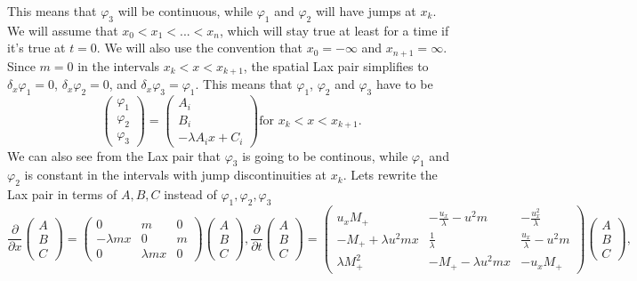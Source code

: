 \documentclass[english,master]{liumaiex}
\theoremstyle{plain}
\theoremstyle{definition}
\begin{document}
This means that $\varphi_3$ will be continuous, while $\varphi_1$ and $\varphi_2$ will have jumps at $x_k$. We will assume that $x_0 < x_1 < ... < x_n$, which will stay true at least for a time if it's true at $t = 0$. We will also use the convention that $x_0 = -\infty$ and $x_{n+1} = \infty$. Since $m = 0$ in the intervals $x_k < x < x_{k+1}$, the spatial Lax pair simplifies to $\delta_x \varphi_1 = 0$, $\delta_x \varphi_2 = 0$, and $\delta_x \varphi_3 = \varphi_1$. This means that $\varphi_1$, $\varphi_2$ and $\varphi_3$ have to be
\begin{equation}
\begin{pmatrix} \varphi_1 \\ \varphi_2 \\ \varphi_3 \end{pmatrix} =
\begin{pmatrix} A_i \\ B_i \\ -\lambda A_i x + C_i \end{pmatrix} 
\text{for } x_k < x < x_{k+1}.
\end{equation}
We can also see from the Lax pair that $\varphi_3$ is going to be continous, while $\varphi_1$ and $\varphi_2$ is constant in the intervals with jump discontinuities at $x_k$. Lets rewrite the Lax pair in terms of $A, B, C$ instead of $\varphi_1, \varphi_2, \varphi_3$
\begin{subequations}
  \begin{equation}
    \frac{\partial}{\partial x}
    \begin{pmatrix} A \\ B \\ C \end{pmatrix} =
    \begin{pmatrix}
      0 & m & 0 \\
      -\lambda m x & 0 & m \\
      0 & \lambda m x & 0
    \end{pmatrix}
    \begin{pmatrix} A \\ B \\ C \end{pmatrix}
    ,
  \end{equation}
  \begin{equation}
    \frac{\partial}{\partial t}
    \begin{pmatrix} A \\ B \\ C \end{pmatrix} =
    \begin{pmatrix}
      u_x M_+ & -\frac{u_x}{\lambda} -u^2 m & -\frac{u_x^2}{\lambda} \\
      -M_+ + \lambda u^2 m x & \frac{1}{\lambda} & \frac{u_x}{\lambda} - u^2 m \\
      \lambda M_+^2 & -M_+ - \lambda u^2 m x & -u_x M_+
    \end{pmatrix}
    \begin{pmatrix} A \\ B \\ C \end{pmatrix}
    ,
  \end{equation}
\end{subequations}
\end{document}
